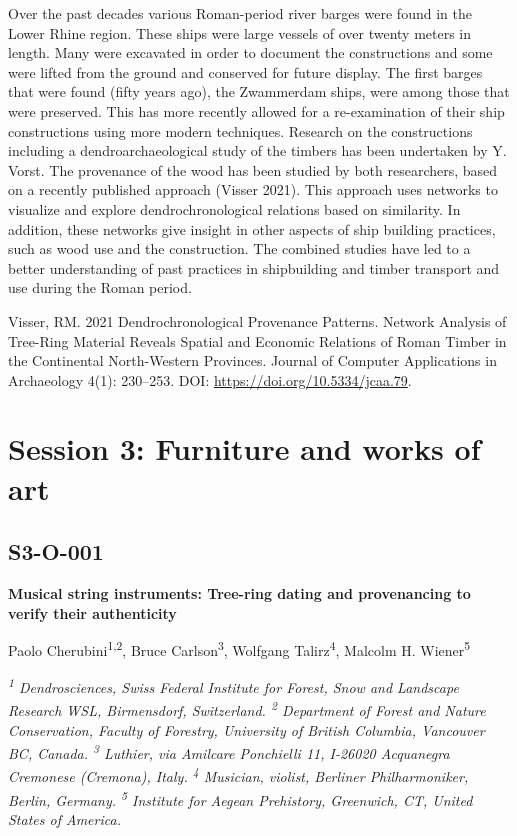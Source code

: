 \documentclass[
]{book}
\begin{document}
Over the past decades various Roman-period river barges were found in the Lower Rhine region. These ships were large vessels of over twenty meters in length. Many were excavated in order to document the constructions and some were lifted from the ground and conserved for future display. The first barges that were found (fifty years ago), the Zwammerdam ships, were among those that were preserved. This has more recently allowed for a re-examination of their ship constructions using more modern techniques. Research on the constructions including a dendroarchaeological study of the timbers has been undertaken by Y. Vorst. The provenance of the wood has been studied by both researchers, based on a recently published approach (Visser 2021). This approach uses networks to visualize and explore dendrochronological relations based on similarity. In addition, these networks give insight in other aspects of ship building practices, such as wood use and the construction. The combined studies have led to a better understanding of past practices in shipbuilding and timber transport and use during the Roman period.

Visser, RM. 2021 Dendrochronological Provenance Patterns. Network Analysis of Tree-Ring Material Reveals Spatial and Economic Relations of Roman Timber in the Continental North-Western Provinces. Journal of Computer Applications in Archaeology 4(1): 230--253. DOI: \url{https://doi.org/10.5334/jcaa.79}.

\hypertarget{session-3-furniture-and-works-of-art}{%
\chapter*{Session 3: Furniture and works of art}\label{session-3-furniture-and-works-of-art}}

\hypertarget{s3-o-001}{%
\section*{S3-O-001}\label{s3-o-001}}

\textbf{Musical string instruments: Tree-ring dating and provenancing to verify their authenticity}

Paolo Cherubini\textsuperscript{1,2}, Bruce Carlson\textsuperscript{3}, Wolfgang Talirz\textsuperscript{4}, Malcolm H. Wiener\textsuperscript{5}

\emph{\textsuperscript{1} Dendrosciences, Swiss Federal Institute for Forest, Snow and Landscape Research WSL, Birmensdorf, Switzerland. \textsuperscript{2} Department of Forest and Nature Conservation, Faculty of Forestry, University of British Columbia, Vancouver BC, Canada. \textsuperscript{3} Luthier, via Amilcare Ponchielli 11, I-26020 Acquanegra Cremonese (Cremona), Italy. \textsuperscript{4} Musician, violist, Berliner Philharmoniker, Berlin, Germany. \textsuperscript{5} Institute for Aegean Prehistory, Greenwich, CT, United States of America.}
\end{document}

